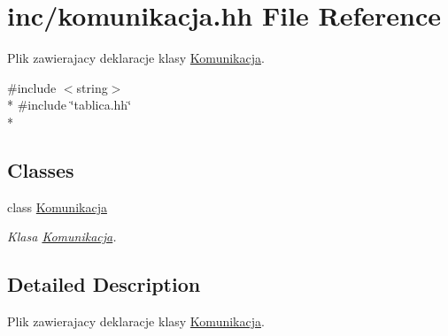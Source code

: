 \hypertarget{komunikacja_8hh}{\section{inc/komunikacja.hh File Reference}
\label{komunikacja_8hh}
}


Plik zawierajacy deklaracje klasy \hyperlink{class_komunikacja}{Komunikacja}.  


{\ttfamily \#include $<$string$>$}\\*
{\ttfamily \#include \char`\"{}tablica.\-hh\char`\"{}}\\*
\subsection*{Classes}
\begin{DoxyCompactItemize}
\item 
class \hyperlink{class_komunikacja}{Komunikacja}
\begin{DoxyCompactList}\small\item\em Klasa \hyperlink{class_komunikacja}{Komunikacja}. \end{DoxyCompactList}\end{DoxyCompactItemize}


\subsection{Detailed Description}
Plik zawierajacy deklaracje klasy \hyperlink{class_komunikacja}{Komunikacja}. 